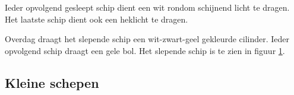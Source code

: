 \begin{figure}[H]
\begin{minipage}[t]{0.22\textwidth}
		\RemoveLine
		\caption{}
		\label{pic:optisch:groot_sleep2}
	\end{minipage}
\end{figure}
\vspace{-0.6cm}
Ieder opvolgend gesleept schip dient een wit rondom schijnend licht te dragen. Het laatste schip dient ook een heklicht te dragen.

Overdag draagt het slepende schip een wit-zwart-geel gekleurde cilinder. Ieder opvolgend schip draagt een gele bol. Het slepende schip is te zien in figuur \ref{pic:optisch:groot_sleep2}.


\subsection{Kleine schepen}

